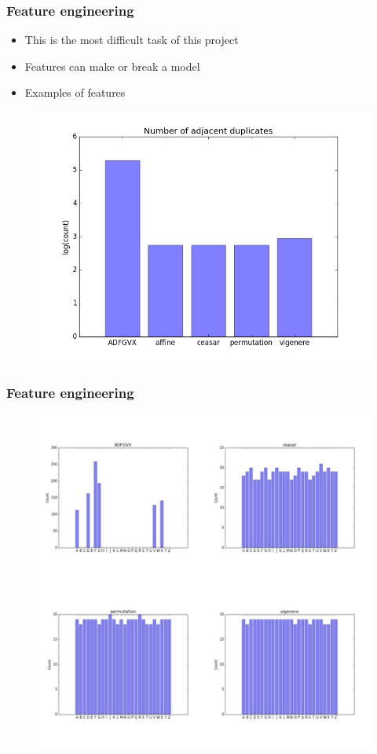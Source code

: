 \documentclass{beamer}
\begin{document}
\begin{frame}
\frametitle{Feature engineering}
\begin{itemize}
	\pause
	\item This is the most difficult task of this project
	\pause
	\item Features can make or break a model
	\pause
	\item Examples of features
\end{itemize}

\pause
\begin{figure}
	\includegraphics[scale=0.4]{no_adj_dups.png}
	\centering
\end{figure}


\end{frame}

\begin{frame}
\frametitle{Feature engineering}

\begin{figure}
	\includegraphics[width=0.6\linewidth]{montage_1.jpg}
	\centering
\end{figure}


\end{frame}
\end{document}
